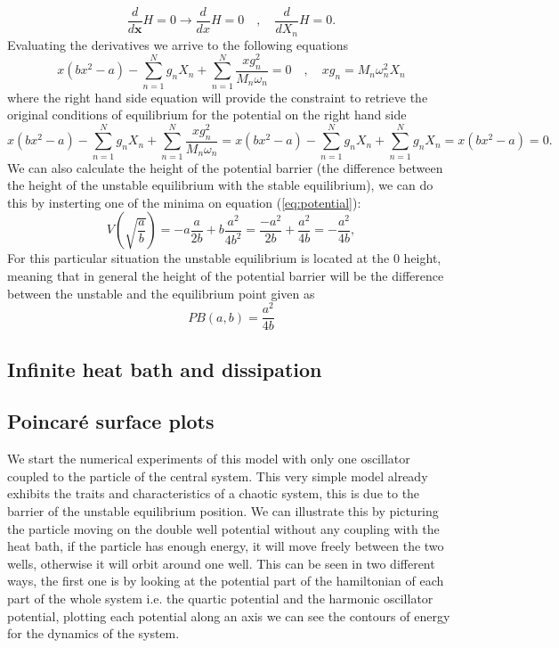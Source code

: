\begin{equation}
\frac{d}{d\textbf{x}}H=0\rightarrow \frac{d}{dx}H =0 \quad , \quad \frac{d}{dX_n}H  = 0.
\end{equation}
Evaluating the derivatives we arrive to the following equations
\begin{equation}
x(bx^2-a)-\sum_{n=1}^N g_n X_n +\sum_{n=1}^N \frac{xg_n^2}{M_n\omega_n}=0 \quad , \quad xg_n=M_n\omega_n^2 X_n 
\end{equation}
where the right hand side equation will provide the constraint to retrieve the original conditions of equilibrium for the potential on the right hand side
\begin{equation}
x(bx^2-a)-\sum_{n=1}^N g_n X_n +\sum_{n=1}^N \frac{xg_n^2}{M_n\omega_n}= x(bx^2-a)-\sum_{n=1}^N g_n X_n +\sum_{n=1}^N g_n X_n=x(bx^2-a)=0.
\end{equation}
We can also calculate the height of the potential barrier (the difference between the height of the unstable equilibrium with the stable equilibrium), we can do this by insterting one of the minima on equation (\ref{eq:potential}):
\begin{equation}
V(\sqrt{\frac{a}{b}})=-a\frac{a}{2b}+b\frac{a^2}{4b^2}=\frac{-a^2}{2b}+\frac{a^2}{4b}=-\frac{a^2}{4b},
\end{equation}
For this particular situation the unstable equilibrium is located at the $0$ height, meaning that in general the height of the potential barrier will be the difference between the unstable and the equilibrium point given as
\begin{equation}
PB(a,b)=\frac{a^2}{4b}
\label{eq:PB_eq}
\end{equation}


\subsection{Infinite heat bath and dissipation}



\subsection{Poincaré surface plots}
We start the numerical experiments of this model with only one oscillator coupled to the particle of the central system. This very simple model already exhibits the traits and characteristics of a chaotic system, this is due to the barrier of the unstable equilibrium position. We can illustrate this by picturing the particle moving on the double well potential without any coupling with the heat bath, if the particle has enough energy, it will move freely between the two wells, otherwise it will orbit around one well. This can be seen in two different ways, the first one is by looking at the potential part of the hamiltonian of each part of the whole system i.e. the quartic potential and the harmonic oscillator potential, plotting each potential along an axis we can see the contours of energy for the dynamics of the system.

